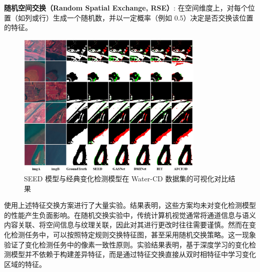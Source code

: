 \textbf{随机空间交换（Random Spatial Exchange, RSE）}: 在空间维度上，对每个位置（如列或行）生成一个随机数，并以一定概率（例如 0.5）决定是否交换该位置的特征。  



\begin{figure}[!htbp]
  \centering
  \includegraphics[width=0.8\textwidth]{paper_figures/变化检测任务基础范式设计/seed_watercd.png}
  \caption{SEED 模型与经典变化检测模型在 Water-CD 数据集的可视化对比结果}
  \label{fig:seed_watercd}
\end{figure}

使用上述特征交换方案进行了大量实验。结果表明，这些方案均未对变化检测模型的性能产生负面影响。在随机交换实验中，传统计算机视觉通常将通道信息与语义内容关联、将空间信息与纹理关联，因此对其进行更改时往往需要谨慎。然而在变化检测任务中，可以按照特定规则交换特征图，甚至采用随机交换策略。这一现象验证了变化检测任务中的像素一致性原则。实验结果表明，基于深度学习的变化检测模型并不依赖于构建差异特征，而是通过特征交换直接从双时相特征中学习变化区域的特征。


